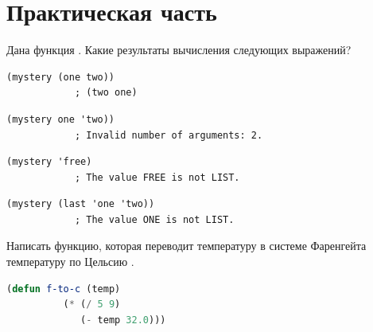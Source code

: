 \documentclass[a4paper,oneside,12pt]{extreport}
\begin{document}


\section*{Практическая часть}

\begin{task}
	Дана функция .
	Какие результаты вычисления следующих выражений?
	\begin{AutoMultiColEnumerate}
		\item \begin{lstlisting}[style=lispinline, gobble=24]
			(mystery (one two))
			; (two one)
		\end{lstlisting}

		\item \begin{lstlisting}[style=lispinline, gobble=24]
			(mystery one 'two))
			; Invalid number of arguments: 2.
		\end{lstlisting}

		\item \begin{lstlisting}[style=lispinline, gobble=24]
			(mystery 'free)
			; The value FREE is not LIST.
		\end{lstlisting}

		\item \begin{lstlisting}[style=lispinline, gobble=24]
			(mystery (last 'one 'two))
			; The value ONE is not LIST.
		\end{lstlisting}
	\end{AutoMultiColEnumerate}
\end{task}

\begin{task}
	Написать функцию, которая переводит температуру в системе Фаренгейта температуру по Цельсию .

	\begin{lstlisting}[language=Lisp, gobble=16]
		(defun f-to-c (temp)
		  (* (/ 5 9)
		     (- temp 32.0)))
	\end{lstlisting}
\end{task}
\end{document}
